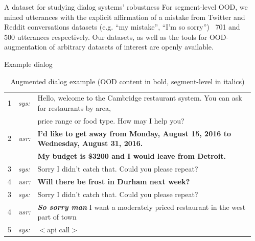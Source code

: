 \documentclass[final]{beamer}
\newlength{\sepwidth}
\newlength{\colwidth}
\newcommand{\separatorcolumn}{\begin{column}{\sepwidth}\end{column}}
\begin{document}
\begin{frame}[t]
\begin{columns}[t]
\begin{column}{\colwidth}
\begin{block}{A dataset for studying dialog systems' robustness}
For segment-level OOD, we mined utterances with the explicit affirmation of a mistake from Twitter and Reddit conversations datasets (e.g. ``my mistake'', ``I'm so sorry'')~\textemdash{} 701 and 500 utterances respectively.
Our datasets, as well as the tools for OOD-augmentation of arbitrary datasets of interest are openly available.
\end{block}

\begin{alertblock}{Example dialog}

\begin{table}
  \centering
  \small
    \begin{tabular}{c|l|p{}}
      1&\textit{sys:}&Hello, welcome to the Cambridge restaurant system. You can ask for restaurants by area, \\
      &&price range or food type. How may I help you?  \\
      2&\textit{usr:}&\textbf{I'd like to get away from Monday, August 15, 2016 to Wednesday, August 31, 2016.} \\
      &&\textbf{My budget is \$3200 and I would leave from Detroit.} \\
      3&\textit{sys:}&Sorry I didn't catch that. Could you please repeat? \\
      4&\textit{usr:}&\textbf{Will there be frost in Durham next week?}\\
      3&\textit{sys:}&Sorry I didn't catch that. Could you please repeat? \\
      4&\textit{usr:}&\textbf{\textit{So sorry man}} I want a moderately priced restaurant in the west part of town \\
      5&\textit{sys:}&$<$api call$>$
    \end{tabular}
    \caption{Augmented dialog example (OOD content in bold, segment-level in italics)}
    \label{tab:augmentation_example}
\end{table}
\end{alertblock}
\end{column}

\separatorcolumn


\end{columns}
\end{frame}
\end{document}
